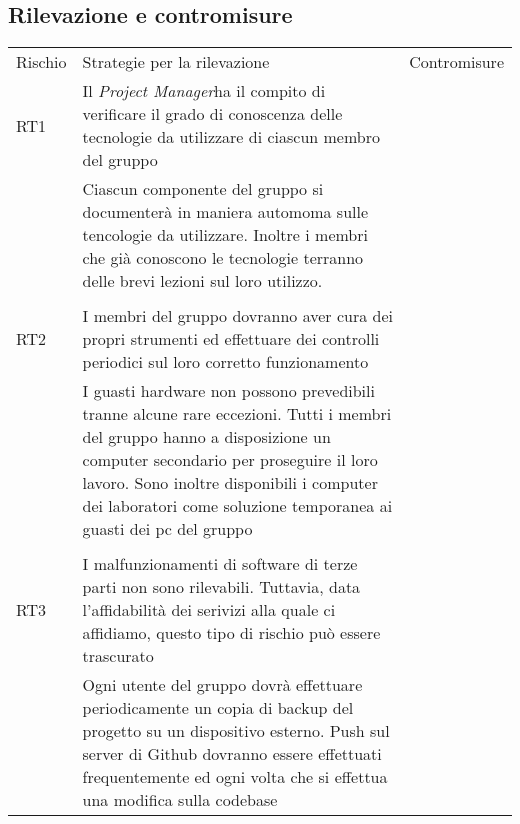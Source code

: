 \subsection{Rilevazione e contromisure}

\begin{table}
	\centering
	\begin{tabular}{l|l|l}
		Rischio & Strategie per la rilevazione  & Contromisure  \\
		RT1     & Il \emph{Project Manager}ha il compito di verificare il grado di conoscenza delle tecnologie da utilizzare di ciascun membro del gruppo\\                                                                                           & Ciascun componente del gruppo si documenterà in maniera automoma sulle tencologie da utilizzare. Inoltre i membri che già conoscono le tecnologie terranno delle brevi lezioni sul loro utilizzo.\\                                                                                                                                                                                                                                                                                  \\
		RT2     & I membri del gruppo dovranno aver cura dei propri strumenti ed effettuare dei controlli periodici sul loro corretto funzionamento\\                                                                                                              & I guasti hardware non possono prevedibili tranne alcune rare eccezioni. Tutti i membri del gruppo hanno a disposizione un computer secondario per proseguire il loro lavoro. Sono inoltre disponibili i computer dei laboratori come soluzione temporanea ai guasti dei pc del gruppo\\                                                                                                                                                                                             \\
		RT3     & I malfunzionamenti di software di terze parti non sono rilevabili. Tuttavia, data l'affidabilità dei serivizi alla quale ci affidiamo, questo tipo di rischio può essere trascurato\\                                                            & Ogni utente del gruppo dovrà effettuare periodicamente un copia di backup del progetto su un dispositivo esterno. Push sul server di Github dovranno essere effettuati frequentemente ed ogni volta che si effettua una modifica sulla codebase                                                                                                                                                                                                                                      \\

\end{tabular}
\end{table}
